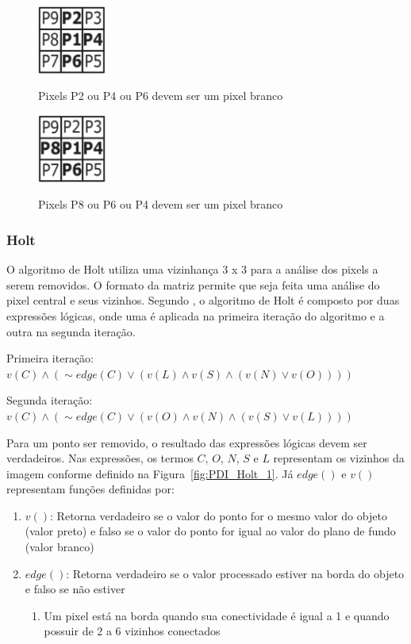 \documentclass[12pt,oneside,a4paper,english,french,spanish,brazil,]{abntex2}
\begin{document}
\begin{figure}[ht]
\centering
\caption{Pixels P2 ou P4 ou P6 devem ser um pixel branco}
\includegraphics[width=0.2\textwidth]{imagens/PDI_Zhang_Suen_4.PNG}
\label{fig:PDI_Zhang_Suen_4}
\end{figure}

\begin{figure}[ht]
\centering
\caption{Pixels P8 ou P6 ou P4 devem ser um pixel branco}
\includegraphics[width=0.2\textwidth]{imagens/PDI_Zhang_Suen_5.PNG}
\label{fig:PDI_Zhang_Suen_5}
\end{figure}

\subsubsection{Holt}

O algoritmo de Holt \cite{holt:1987} utiliza uma vizinhança 3 x 3 para a análise dos pixels a serem removidos. O formato da matriz permite que seja feita uma análise do pixel central e seus vizinhos. Segundo \citet{guilherme:2007}, o algoritmo de Holt é composto por duas expressões lógicas, onde uma é aplicada na primeira iteração do algoritmo e a outra na segunda iteração.


Primeira iteração: 
\(v(C) \wedge (\sim edge(C) \vee (v(L) \wedge v(S) \wedge (v(N) \vee v(O))))\)

Segunda iteração:
\(v(C) \wedge (\sim edge(C) \vee (v(O) \wedge v(N) \wedge (v(S) \vee v(L))))\)

Para um ponto ser removido, o resultado das expressões lógicas devem ser verdadeiros. Nas expressões, os termos \(C\), \(O\), \(N\), \(S\) e \(L\) representam os vizinhos da imagem conforme definido na Figura~\ref{fig:PDI_Holt_1}. Já \(edge()\) e \(v()\) representam funções definidas por:
\begin{enumerate}
\item \(v()\): Retorna verdadeiro se o valor do ponto for o mesmo valor do objeto (valor preto) e falso se o valor do ponto for igual ao valor do plano de fundo (valor branco)
\item \(edge()\): Retorna verdadeiro se o valor processado estiver na borda do objeto e falso se não estiver
\begin{enumerate}[label*=\roman*.]
    \item Um pixel está na borda quando sua conectividade é igual a 1 e quando possuir de 2 a 6 vizinhos conectados
  \end{enumerate}
\end{enumerate}
\end{document}

